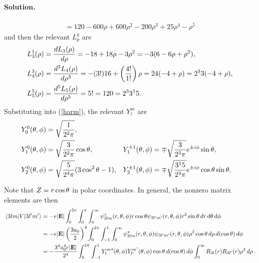 \documentclass[11pt]{article}
\newcommand{\refeq}[1]{(\ref{#1})}
\newenvironment{solution}
{
    \paragraph{Solution.}
    \ignorespaces
}
{
}
\begin{document}
\begin{solution}
\begin{align*}
		= 120 - 600 \rho + 600 \rho^2 - 200 \rho^3 + 25 \rho^4 - \rho^5
	\end{align*}
	and then the relevant $L_p^q$ are
	\begin{align*}
		L_3^1(\rho) &= \dv{L_3(\rho)}{\rho} 
		= -18 + 18 \rho - 3 \rho^2
		= -3 (6 - 6 \rho + \rho^2), \\
		L_4^3(\rho) &= \dv[3]{L_4(\rho)}{\rho}
		= -(3!) 16 + \left( \frac{4!}{1!} \right) \rho
		= 24 (-4 + \rho)
		= 2^3 3 (-4 + \rho), \\
		L_5^5(\rho) &= \dv[5]{L_5(\rho)}{\rho}
		= 5!
		= 120
		= 2^3 3^1 5.
	\end{align*}
	\clearpage
	Substituting into \refeq{harm}, the relevant $Y_l^m$ are
	\begin{align*}
		Y_0^0(\theta, \phi) &= \sqrt{\frac{1}{2^2 \pi}}, \\
		Y_1^0(\theta, \phi) &= \sqrt{\frac{3}{2^2 \pi}} \cos\theta, &
		Y_1^{\pm 1}(\theta, \phi) &= \mp \sqrt{\frac{3}{2^3 \pi}} e^{\pm i \phi} \sin\theta, \\
		Y_2^0(\theta, \phi) &= \sqrt{\frac{5}{2^4 \pi}} (3 \cos^2\theta - 1), &
		Y_2^{\pm1}(\theta, \phi) &= \mp \sqrt{\frac{3^1 5}{2^3 \pi}} e^{\pm i \phi} \cos\theta \sin\theta.
	\end{align*}
	
	Note that $Z = r \cos\theta$ in polar coordinates.  In general, the nonzero matrix elements are then
	\begin{align*}
		\mel{3 l m}{V}{3 l' m'} &= -e |\mathbf{E}| \int_0^{2\pi} \int_0^\pi \int_0^\infty \psi_{3 l m}^*(r, \theta, \phi) r \cos\theta \psi_{3 l' m'}(r, \theta, \phi) r^2 \sin\theta \dd{r} \dd{\theta} \dd{\phi} \\
		&= -e |\mathbf{E}| \left( \frac{3 a_0}{2} \right)^4 \int_0^{2\pi} \int_{-1}^1 \int_0^\infty \psi_{3 l m}^*(r, \theta, \phi) \psi_{3 l' m'}(r, \theta, \phi) \rho^3 \cos\theta \dd{\rho} \dd{(\cos\theta)} \dd{\phi} \\
		&= -\frac{3^4 a_0^4 e |\mathbf{E}|}{2^4} \int_0^{2\pi} \int_{-1}^1 {Y_l^m}^*(\theta, \phi) Y_{l'}^{m'}(\theta, \phi) \cos\theta \dd{(\cos\theta)} \dd{\phi} \int_0^\infty R_{3 l}(r) R_{3 l'}(r) \rho^3 \dd{\rho}.
	\end{align*}
	

\end{solution}
\end{document}

